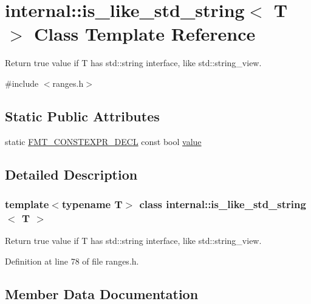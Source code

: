 \hypertarget{classinternal_1_1is__like__std__string}{}\section{internal\+:\+:is\+\_\+like\+\_\+std\+\_\+string$<$ T $>$ Class Template Reference}
\label{classinternal_1_1is__like__std__string}


Return true value if T has std\+::string interface, like std\+::string\+\_\+view.  




{\ttfamily \#include $<$ranges.\+h$>$}

\subsection*{Static Public Attributes}
\begin{DoxyCompactItemize}
\item 
static \hyperlink{core_8h_af4388801466a5994a363d6005616371a}{F\+M\+T\+\_\+\+C\+O\+N\+S\+T\+E\+X\+P\+R\+\_\+\+D\+E\+CL} const bool \hyperlink{classinternal_1_1is__like__std__string_a669d29cac2e005cbe132b885f482cdbf}{value}
\end{DoxyCompactItemize}


\subsection{Detailed Description}
\subsubsection*{template$<$typename T$>$\newline
class internal\+::is\+\_\+like\+\_\+std\+\_\+string$<$ T $>$}

Return true value if T has std\+::string interface, like std\+::string\+\_\+view. 

Definition at line 78 of file ranges.\+h.



\subsection{Member Data Documentation}
\mbox{\label{classinternal_1_1is__like__std__string_a669d29cac2e005cbe132b885f482cdbf}} 
